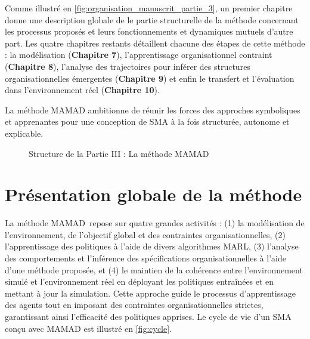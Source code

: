 \medskip

\noindent
Comme illustré en \autoref{fig:organisation_manuscrit_partie_3}, un premier chapitre donne une description globale de le partie structurelle de la méthode concernant les processus proposés et leurs fonctionnements et dynamiques mutuels d'autre part. Les quatre chapitres restants détaillent chacune des étapes de cette méthode :
la modélisation (\textbf{Chapitre 7}), l'apprentissage organisationnel contraint (\textbf{Chapitre 8}), l'analyse des trajectoires pour inférer des structures organisationnelles émergentes (\textbf{Chapitre 9}) et enfin le transfert et l'évaluation dans l'environnement réel (\textbf{Chapitre 10}).

La méthode \ac{MAMAD} ambitionne de réunir les forces des approches symboliques et apprenantes pour une conception de \ac{SMA} à la fois structurée, autonome et explicable.

\begin{figure}[h!]
    \centering
    \resizebox{\linewidth}{!}{%
        
    }
    \caption{Structure de la Partie III : La méthode MAMAD}
    \label{fig:organisation_manuscrit_partie_3}
\end{figure}



\chapter{Présentation globale de la méthode}
\label{sec:mamad}


La méthode \ac{MAMAD}~\footnotemark[1] repose sur quatre grandes activités : (1) la modélisation de l'environnement, de l'objectif global et des contraintes organisationnelles, (2) l'apprentissage des politiques à l'aide de divers algorithmes \ac{MARL}, (3) l'analyse des comportements et l'inférence des spécifications organisationnelles à l'aide d'une méthode proposée, et (4) le maintien de la cohérence entre l'environnement simulé et l'environnement réel en déployant les politiques entraînées et en mettant à jour la simulation. Cette approche guide le processus d'apprentissage des agents tout en imposant des contraintes organisationnelles strictes, garantissant ainsi l'efficacité des politiques apprises. Le cycle de vie d'un \ac{SMA} conçu avec \ac{MAMAD} est illustré en \autoref{fig:cycle}.

